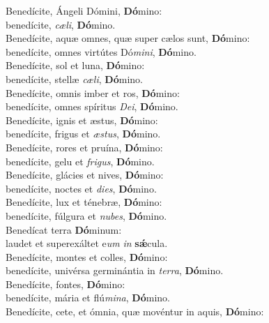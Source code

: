 \evenverse Benedícite, Ángeli Dómini, \textbf{Dó}mino:~\*\\
\evenverse benedícite, \textit{cæ}\textit{li}, \textbf{Dó}mino.\\
\oddverse Benedícite, aquæ omnes, quæ super cælos sunt, \textbf{Dó}mino:~\*\\
\oddverse benedícite, omnes virtútes Dó\textit{mi}\textit{ni}, \textbf{Dó}mino.\\
\evenverse Benedícite, sol et luna, \textbf{Dó}mino:~\*\\
\evenverse benedícite, stellæ \textit{cæ}\textit{li}, \textbf{Dó}mino.\\
\oddverse Benedícite, omnis imber et ros, \textbf{Dó}mino:~\*\\
\oddverse benedícite, omnes spíritus \textit{De}\textit{i}, \textbf{Dó}mino.\\
\evenverse Benedícite, ignis et æstus, \textbf{Dó}mino:~\*\\
\evenverse benedícite, frigus et \textit{æ}\textit{stus}, \textbf{Dó}mino.\\
\oddverse Benedícite, rores et pruína, \textbf{Dó}mino:~\*\\
\oddverse benedícite, gelu et \textit{fri}\textit{gus}, \textbf{Dó}mino.\\
\evenverse Benedícite, glácies et nives, \textbf{Dó}mino:~\*\\
\evenverse benedícite, noctes et \textit{di}\textit{es}, \textbf{Dó}mino.\\
\oddverse Benedícite, lux et ténebræ, \textbf{Dó}mino:~\*\\
\oddverse benedícite, fúlgura et \textit{nu}\textit{bes}, \textbf{Dó}mino.\\
\evenverse Benedícat terra \textbf{Dó}minum:~\*\\
\evenverse laudet et superexáltet e\textit{um} \textit{in} \textbf{sǽ}cula.\\
\oddverse Benedícite, montes et colles, \textbf{Dó}mino:~\*\\
\oddverse benedícite, univérsa germinántia in \textit{ter}\textit{ra}, \textbf{Dó}mino.\\
\evenverse Benedícite, fontes, \textbf{Dó}mino:~\*\\
\evenverse benedícite, mária et flú\textit{mi}\textit{na}, \textbf{Dó}mino.\\
\oddverse Benedícite, cete, et ómnia, quæ movéntur in aquis, \textbf{Dó}mino:~\*\\
